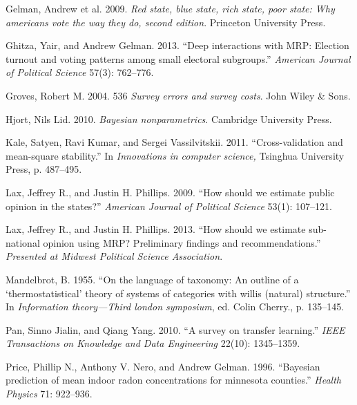 Gelman, Andrew et al. 2009. \emph{Red state, blue state, rich state,
poor state: Why americans vote the way they do, second edition}.
Princeton University Press.

Ghitza, Yair, and Andrew Gelman. 2013. ``Deep interactions with MRP:
Election turnout and voting patterns among small electoral subgroups.''
\emph{American Journal of Political Science} 57(3): 762--776.

Groves, Robert M. 2004. 536 \emph{Survey errors and survey costs}. John
Wiley \& Sons.

Hjort, Nils Lid. 2010. \emph{Bayesian nonparametrics}. Cambridge
University Press.

Kale, Satyen, Ravi Kumar, and Sergei Vassilvitskii. 2011.
``Cross-validation and mean-square stability.'' In \emph{Innovations in
computer science,} Tsinghua University Press, p. 487--495.

Lax, Jeffrey R., and Justin H. Phillips. 2009. ``How should we estimate
public opinion in the states?'' \emph{American Journal of Political
Science} 53(1): 107--121.

Lax, Jeffrey R., and Justin H. Phillips. 2013. ``How should we estimate
sub-national opinion using MRP? Preliminary findings and
recommendations.'' \emph{Presented at Midwest Political Science
Association}.

Mandelbrot, B. 1955. ``On the language of taxonomy: An outline of a
`thermostatistical' theory of systems of categories with willis
(natural) structure.'' In \emph{Information theory---Third london
symposium}, ed. Colin Cherry., p. 135--145.

Pan, Sinno Jialin, and Qiang Yang. 2010. ``A survey on transfer
learning.'' \emph{IEEE Transactions on Knowledge and Data Engineering}
22(10): 1345--1359.

Price, Phillip N., Anthony V. Nero, and Andrew Gelman. 1996. ``Bayesian
prediction of mean indoor radon concentrations for minnesota counties.''
\emph{Health Physics} 71: 922--936.

